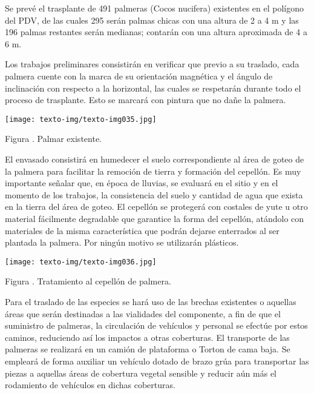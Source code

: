 \documentclass{article}
\newcounter{Figura}
\renewcommand\theFigura{\arabic{Figura}}
\begin{document}
\bigskip

Se prevé el trasplante de 491 palmeras (Cocos nucifera) existentes en el polígono del PDV, de las cuales 295 serán palmas chicas con una altura de 2 a 4 m y las 196 palmas restantes serán medianas; contarán con una altura aproximada de 4 a 6 m. 


\bigskip

Los trabajos preliminares consistirán en verificar que previo a su traslado, cada palmera cuente con la marca de su orientación magnética y el ángulo de inclinación con respecto a la horizontal, las cuales se respetarán durante todo el proceso de trasplante. Esto se marcará con pintura que no dañe la palmera.


\bigskip

 \texttt{[image: texto-img/texto-img035.jpg]} 

Figura \stepcounter{Figura}{\theFigura}. Palmar existente.


\bigskip

El envasado consistirá en humedecer el suelo correspondiente al área de goteo de la palmera para facilitar la remoción de tierra y formación del cepellón. Es muy importante señalar que, en época de lluvias, se evaluará en el sitio y en el momento de los trabajos, la consistencia del suelo y cantidad de agua que exista en la tierra del área de goteo. El cepellón se protegerá con costales de yute u otro material fácilmente degradable que garantice la forma del cepellón, atándolo con materiales de la misma característica que podrán dejarse enterrados al ser plantada la palmera. Por ningún motivo se utilizarán plásticos. 


\bigskip

 \texttt{[image: texto-img/texto-img036.jpg]} 

Figura \stepcounter{Figura}{\theFigura}. Tratamiento al cepellón de palmera.


\bigskip

Para el traslado de las especies se hará uso de las brechas existentes o aquellas áreas que serán destinadas a las vialidades del componente, a fin de que el suministro de palmeras, la circulación de vehículos y personal se efectúe por estos caminos, reduciendo así los impactos a otras coberturas. El transporte de las palmeras se realizará en un camión de plataforma o Torton de cama baja. Se empleará de forma auxiliar un vehículo dotado de brazo grúa para transportar las piezas a aquellas áreas de cobertura vegetal sensible y reducir aún más el rodamiento de vehículos en dichas coberturas.
\end{document}
